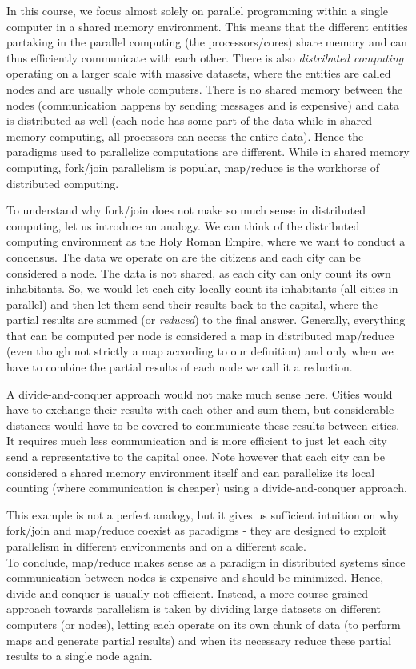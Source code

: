 \documentclass[main.tex]{subfiles}
\begin{document}
In this course, we focus almost solely on parallel programming within a single computer in a shared memory environment. This means that the different entities partaking in the parallel computing (the processors/cores) share memory and can thus efficiently communicate with each other. There is also \textit{distributed computing} operating on a larger scale with massive datasets, where the entities are called nodes and are usually whole computers. There is no shared memory between the nodes (communication happens by sending messages and is expensive) and data is distributed as well (each node has some part of the data while in shared memory computing, all processors can access the entire data). Hence the paradigms used to parallelize computations are different. While in shared memory computing, fork/join parallelism is popular, map/reduce is the workhorse of distributed computing.

To understand why fork/join does not make so much sense in distributed computing, let us introduce an analogy. We can think of the distributed computing environment as the Holy Roman Empire, where we want to conduct a concensus. The data we operate on are the citizens and each city can be considered a node. The data is not shared, as each city can only count its own inhabitants. So, we would let each city locally count its inhabitants (all cities in parallel) and then let them send their results back to the capital, where the partial results are summed (or \textit{reduced}) to the final answer. Generally, everything that can be computed per node is considered a map in distributed map/reduce (even though not strictly a map according to our definition) and only when we have to combine the partial results of each node we call it a reduction.

A divide-and-conquer approach would not make much sense here. Cities would have to exchange their results with each other and sum them, but considerable distances would have to be covered to communicate these results between cities. It requires much less communication and is more efficient to just let each city send a representative to the capital once. Note however that each city can be considered a shared memory environment itself and can parallelize its local counting (where communication is cheaper) using a divide-and-conquer approach.

This example is not a perfect analogy, but it gives us sufficient intuition on why fork/join and map/reduce coexist as paradigms - they are designed to exploit parallelism in different environments and on a different scale.\\[3mm]
To conclude, map/reduce makes sense as a paradigm in distributed systems since communication between nodes is expensive and should be minimized. Hence, divide-and-conquer is usually not efficient. Instead, a more course-grained approach towards parallelism is taken by dividing large datasets on different computers (or nodes), letting each operate on its own chunk of data (to perform maps and generate partial results) and when its necessary reduce these partial results to a single node again.
\end{document}
